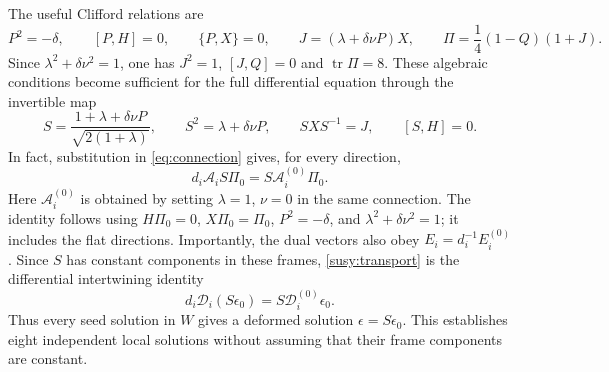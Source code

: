 The useful Clifford relations are
\begin{equation}\label{susy:deformed-projector}
 P^2=-\delta,\qquad [P,H]=0,\qquad \{P,X\}=0,
 \qquad J=(\lambda+\delta\nu P)X,
 \qquad \Pi=\frac14(1-Q)(1+J).
\end{equation}
Since $\lambda^2+\delta\nu^2=1$, one has $J^2=1$, $[J,Q]=0$ and $\operatorname{tr}\Pi=8$. These algebraic conditions become sufficient for the full differential equation through the invertible map
\begin{equation}\label{susy:spinor-map}
 S=\frac{1+\lambda+\delta\nu P}{\sqrt{2(1+\lambda)}},
 \qquad S^2=\lambda+\delta\nu P,\qquad
 SXS^{-1}=J,\qquad [S,H]=0.
\end{equation}
In fact, substitution in \eqref{eq:connection} gives, for every direction,
\begin{equation}\label{susy:transport}
 d_i\mathcal A_i S\Pi_0=S\mathcal A_i^{(0)}\Pi_0.
\end{equation}
Here $\mathcal A_i^{(0)}$ is obtained by setting $\lambda=1$, $\nu=0$ in the same connection. The identity follows using $H\Pi_0=0$, $X\Pi_0=\Pi_0$, $P^2=-\delta$, and $\lambda^2+\delta\nu^2=1$; it includes the flat directions. Importantly, the dual vectors also obey $E_i=d_i^{-1}E_i^{(0)}$. Since $S$ has constant components in these frames, \eqref{susy:transport} is the differential intertwining identity
\begin{equation}\label{susy:operator-transport}
 d_i\mathscr D_i(S\epsilon_0)=S\mathscr D_i^{(0)}\epsilon_0.
\end{equation}
Thus every seed solution in $W$ gives a deformed solution $\epsilon=S\epsilon_0$. This establishes eight independent local solutions without assuming that their frame components are constant.

